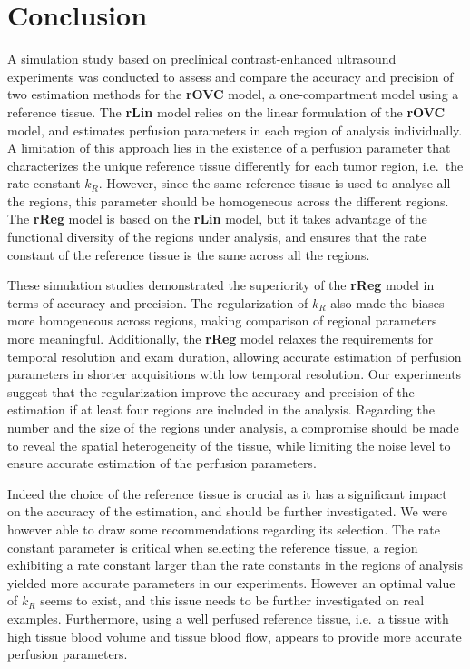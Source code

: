 \section{Conclusion}
A simulation study based on preclinical contrast-enhanced ultrasound experiments was conducted to assess and compare the accuracy and precision of two estimation methods for the \textbf{rOVC} model, a one-compartment model using a reference tissue.
The \textbf{rLin} model relies on the linear formulation of the \textbf{rOVC} model, and estimates perfusion parameters in each region of analysis individually.
A limitation of this approach lies in the existence of a perfusion parameter that characterizes the unique reference tissue differently for each tumor region, i.e.~the rate constant $k_R$.
However, since the same reference tissue is used to analyse all the regions, this parameter should be homogeneous across the different regions.
The \textbf{rReg} model is based on the \textbf{rLin} model, but it takes advantage of the functional diversity of the regions under analysis, and ensures that the rate constant of the reference tissue is the same across all the regions.

These simulation studies demonstrated the superiority of the \textbf{rReg} model in terms of accuracy and precision.
The regularization of $k_R$ also made the biases more homogeneous across regions, making comparison of regional parameters more meaningful.
Additionally, the \textbf{rReg} model relaxes the requirements for temporal resolution and exam duration, allowing accurate estimation of perfusion parameters in shorter acquisitions with low temporal resolution.
Our experiments suggest that the regularization improve the accuracy and precision of the estimation if at least four regions are included in the analysis.
Regarding the number and the size of the regions under analysis, a compromise should be made to reveal the spatial heterogeneity of the tissue, while limiting the noise level to ensure accurate estimation of the perfusion parameters.

Indeed the choice of the reference tissue is crucial as it has a significant impact on the accuracy of the estimation, and should be further investigated.
We were however able to draw some recommendations regarding its selection.
The rate constant parameter is critical when selecting the reference tissue, a region exhibiting a rate constant larger than the rate constants in the regions of analysis yielded more accurate parameters in our experiments.
However an optimal value of $k_R$ seems to exist, and this issue needs to be further investigated on real examples.
Furthermore, using a well perfused reference tissue, i.e.~a tissue with high tissue blood volume and tissue blood flow, appears to provide more accurate perfusion parameters.